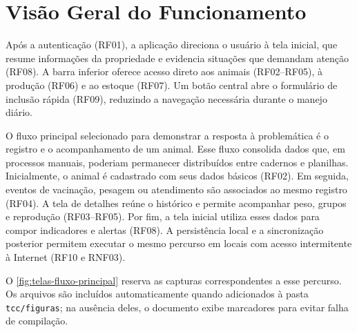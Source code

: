 \section{Visão Geral do Funcionamento}
\label{sec:desenvolvimento-visao-geral}

Após a autenticação (RF01), a aplicação direciona o usuário à tela inicial, que resume informações da propriedade e evidencia situações que demandam atenção (RF08). A barra inferior oferece acesso direto aos animais (RF02--RF05), à produção (RF06) e ao estoque (RF07). Um botão central abre o formulário de inclusão rápida (RF09), reduzindo a navegação necessária durante o manejo diário.

O fluxo principal selecionado para demonstrar a resposta à problemática é o registro e o acompanhamento de um animal. Esse fluxo consolida dados que, em processos manuais, poderiam permanecer distribuídos entre cadernos e planilhas. Inicialmente, o animal é cadastrado com seus dados básicos (RF02). Em seguida, eventos de vacinação, pesagem ou atendimento são associados ao mesmo registro (RF04). A tela de detalhes reúne o histórico e permite acompanhar peso, grupos e reprodução (RF03--RF05). Por fim, a tela inicial utiliza esses dados para compor indicadores e alertas (RF08). A persistência local e a sincronização posterior permitem executar o mesmo percurso em locais com acesso intermitente à Internet (RF10 e RNF03).

O \autoref{fig:telas-fluxo-principal} reserva as capturas correspondentes a esse percurso. Os arquivos são incluídos automaticamente quando adicionados à pasta \texttt{tcc/figuras}; na ausência deles, o documento exibe marcadores para evitar falha de compilação.

